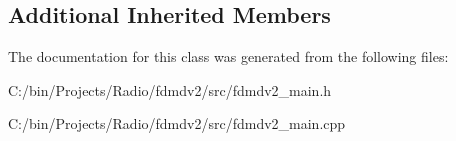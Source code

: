 \subsection*{Additional Inherited Members}


The documentation for this class was generated from the following files\-:\begin{DoxyCompactItemize}
\item 
C\-:/bin/\-Projects/\-Radio/fdmdv2/src/fdmdv2\-\_\-main.\-h\item 
C\-:/bin/\-Projects/\-Radio/fdmdv2/src/fdmdv2\-\_\-main.\-cpp\end{DoxyCompactItemize}
